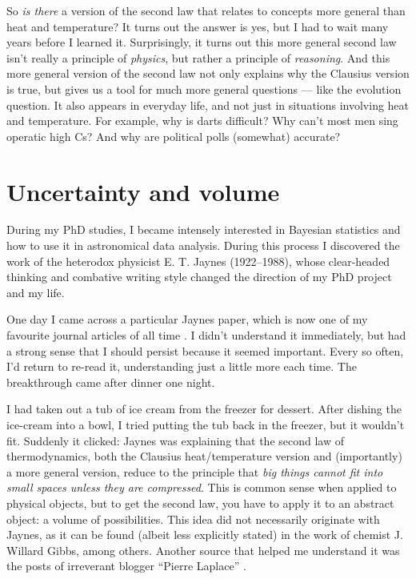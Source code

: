 \documentclass[a4paper, 12pt]{article}
\begin{document}
So {\em is there} a version of the second law that relates to concepts more
general than heat and temperature?
It turns out the answer is yes, but I had to wait many years before I learned it.
Surprisingly, it turns out this more general second law isn't really a
principle of {\em physics}, but rather a
principle of {\em reasoning}. And this more general version of the
second law not only explains why the Clausius version is true, but gives us
a tool for much more general questions --- like the evolution question.
It also appears in everyday life, and not just in situations involving heat and
temperature. For example,
why is darts difficult? Why can't most men sing operatic high Cs?
And why are political polls (somewhat) accurate?

\section*{Uncertainty and volume}
During my PhD studies, I became intensely interested in Bayesian statistics
\citep{brewer}
and how to use it in astronomical data analysis. During this process I
discovered the work of the heterodox physicist E. T. Jaynes \citep{jaynes_site}
(1922--1988), whose clear-headed thinking and combative writing style
changed the direction of my PhD project and my life.

One day I came across a particular Jaynes paper, which is now one of my
favourite journal articles of all time
\citep{jaynes}. I didn't understand it
immediately, but had a strong sense that I should persist because it seemed
important. Every so often, I'd return to re-read it, understanding
just a little more each time. The breakthrough came after dinner one
night.

I had taken out a tub of ice cream from the freezer for dessert. After dishing
the ice-cream into a bowl, I tried putting the tub back in the freezer, but
it wouldn't fit. Suddenly it clicked: Jaynes was explaining that
the second law of thermodynamics, both the Clausius heat/temperature version
and (importantly) a more general version, reduce to the
principle that {\em big things cannot fit into small spaces unless they are
compressed}. This is common sense when applied to physical objects, but to
get the second law, you have to apply it to an abstract object: a volume
of possibilities. This idea did not necessarily originate with Jaynes, as it
can be found (albeit less explicitly stated)
in the work of chemist J. Willard Gibbs, among others. Another source that
helped me understand it was the posts of irreverant blogger ``Pierre Laplace''
\citep{pierre_laplace}.
\end{document}
